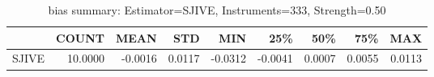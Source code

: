 \begin{table}[ht]
\centering
\caption{bias summary: Estimator=SJIVE, Instruments=333, Strength=0.50}
\begin{tabular}{lrrrrrrrr}
\toprule
 & COUNT & MEAN & STD & MIN & 25\% & 50\% & 75\% & MAX \\
\midrule
SJIVE & 10.0000 & -0.0016 & 0.0117 & -0.0312 & -0.0041 & 0.0007 & 0.0055 & 0.0113 \\
\bottomrule
\end{tabular}
\end{table}
